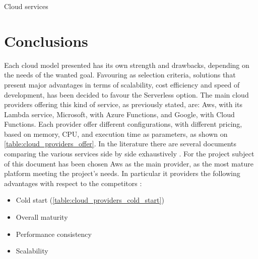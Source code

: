 \begin{chapter}{Cloud services}
    \section{Conclusions}
    Each cloud model presented has its own strength and drawbacks, depending on the
    needs of the wanted goal. Favouring as selection criteria, solutions that present
    major advantages in terms of scalability, cost efficiency and speed of development,
    has been decided to favour the Serverless option.
    The main cloud providers offering this kind of service, as previously stated,
    are: Aws, with its Lambda service, Microsoft, with Azure Functions, and Google,
    with Cloud Functions. Each provider offer different configurations, with different
    pricing, based on memory, CPU, and execution time as parameters, as shown on
    \ref{table:cloud_providers_offer}.
    In the literature there are several documents comparing the various services
    side by side exhaustively \cite{sls_providers_comparison}.
    For the project subject of this document has been chosen Aws as the main provider,
    as the most mature platform meeting the project's needs. In particular it
    providers the following advantages with respect to the competitors \cite{sls_providers_comparison}:
    \begin{itemize}
        \item Cold start (\ref{table:cloud_providers_cold_start})
        \item Overall maturity
        \item Performance consistency
        \item Scalability
    \end{itemize}

    \begin{table}
        \centering
        \begin{tabularx}{0.8\textwidth}{
                | >{\raggedright\arraybackslash}X
                | >{\centering\arraybackslash}X
                | >{\centering\arraybackslash}X
                | >{\centering\arraybackslash}X |
            }


\end{tabularx}
\end{table}
\end{chapter}
